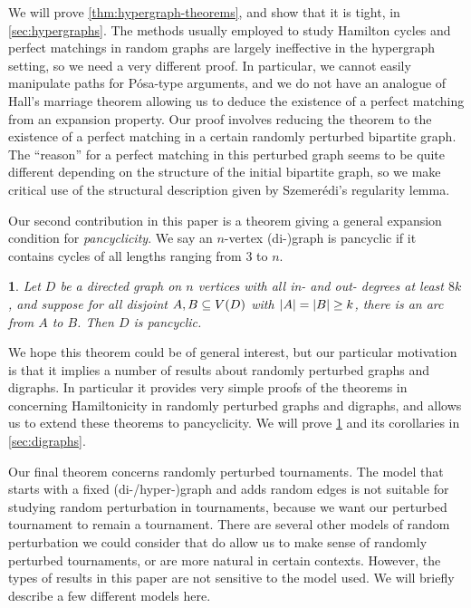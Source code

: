 \documentclass[11pt,english]{article}
\theoremstyle{plain}
\newtheorem{thm}{\protect\theoremname}
\theoremstyle{definition}
\theoremstyle{definition}
\theoremstyle{plain}
\theoremstyle{plain}
\theoremstyle{plain}
\theoremstyle{plain}
\theoremstyle{remark}
\theoremstyle{remark}
\let\originalleft\left
\let\originalright\right
\renewcommand{\left}{\mathopen{}\mathclose\bgroup\originalleft}
\renewcommand{\right}{\aftergroup\egroup\originalright}
\providecommand{\theoremname}{Theorem}
\begin{document}
We will prove \ref{thm:hypergraph-theorems}, and show that it is
tight, in \ref{sec:hypergraphs}. The methods usually employed to
study Hamilton cycles and perfect matchings in random graphs are largely
ineffective in the hypergraph setting, so we need a very different
proof. In particular, we cannot easily manipulate paths for P\'osa-type
arguments, and we do not have an analogue of Hall's marriage theorem
allowing us to deduce the existence of a perfect matching from an
expansion property. Our proof involves reducing the theorem to the
existence of a perfect matching in a certain randomly perturbed bipartite
graph. The ``reason'' for a perfect matching in this perturbed graph
seems to be quite different depending on the structure of the initial
bipartite graph, so we make critical use of the structural description
given by Szemer\'edi's regularity lemma.

Our second contribution in this paper is a theorem giving a general
expansion condition for\emph{ pancyclicity}. We say an $n$-vertex
\mbox{(di-)}graph is pancyclic if it contains cycles of all lengths
ranging from 3 to $n$.
\begin{thm}
\label{lem:pseudorandom-pancyclic}Let $D$ be a directed graph on
$n$ vertices with all in- and out- degrees at least $8k$, and suppose
for all disjoint $A,B\subseteq V\left(D\right)$ with $\left|A\right|=\left|B\right|\ge k$,
there is an arc from $A$ to $B$. Then $D$ is pancyclic.
\end{thm}
We hope this theorem could be of general interest, but our particular
motivation is that it implies a number of results about randomly perturbed
graphs and digraphs. In particular it provides very simple proofs
of the theorems in \cite{BFM03} concerning Hamiltonicity in randomly
perturbed graphs and digraphs, and allows us to extend these theorems
to pancyclicity. We will prove \ref{lem:pseudorandom-pancyclic} and
its corollaries in \ref{sec:digraphs}.

Our final theorem concerns randomly perturbed tournaments. The model
that starts with a fixed \mbox{(di-/hyper-)}graph and adds random
edges is not suitable for studying random perturbation in tournaments,
because we want our perturbed tournament to remain a tournament. There
are several other models of random perturbation we could consider
that do allow us to make sense of randomly perturbed tournaments,
or are more natural in certain contexts. However, the types of results
in this paper are not sensitive to the model used. We will briefly
describe a few different models here.
\end{document}
